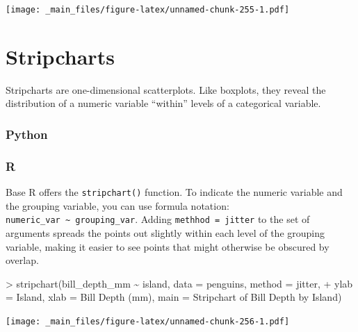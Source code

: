 \documentclass[
]{book}
\newenvironment{Shaded}{\begin{snugshade}}{\end{snugshade}}
\newcommand{\AttributeTok}[1]{\textcolor[rgb]{0.77,0.63,0.00}{#1}}
\newcommand{\FunctionTok}[1]{\textcolor[rgb]{0.00,0.00,0.00}{#1}}
\newcommand{\NormalTok}[1]{#1}
\newcommand{\SpecialCharTok}[1]{\textcolor[rgb]{0.00,0.00,0.00}{#1}}
\newcommand{\StringTok}[1]{\textcolor[rgb]{0.31,0.60,0.02}{#1}}
\begin{document}
\texttt{[image: \_main\_files/figure-latex/unnamed-chunk-255-1.pdf]}

\hypertarget{stripcharts}{%
\section{Stripcharts}\label{stripcharts}}

Stripcharts are one-dimensional scatterplots. Like boxplots, they reveal the distribution of a numeric variable ``within'' levels of a categorical variable.

\hypertarget{python-42}{%
\subsubsection*{Python}\label{python-42}}

\hypertarget{r-42}{%
\subsubsection*{R}\label{r-42}}

Base R offers the \texttt{stripchart()} function. To indicate the numeric variable and the grouping variable, you can use formula notation: \texttt{numeric\_var\ \textasciitilde{}\ grouping\_var}. Adding \texttt{methhod\ =\ \textquotesingle{}jitter\textquotesingle{}} to the set of arguments spreads the points out slightly within each level of the grouping variable, making it easier to see points that might otherwise be obscured by overlap.

\begin{Shaded}
\begin{Highlighting}[]
\SpecialCharTok{\textgreater{}} \FunctionTok{stripchart}\NormalTok{(bill\_depth\_mm }\SpecialCharTok{\textasciitilde{}}\NormalTok{ island, }\AttributeTok{data =}\NormalTok{ penguins, }\AttributeTok{method =} \StringTok{\textquotesingle{}jitter\textquotesingle{}}\NormalTok{,}
\SpecialCharTok{+}            \AttributeTok{ylab =} \StringTok{\textquotesingle{}Island\textquotesingle{}}\NormalTok{, }\AttributeTok{xlab =} \StringTok{\textquotesingle{}Bill Depth (mm)\textquotesingle{}}\NormalTok{, }\AttributeTok{main =} \StringTok{\textquotesingle{}Stripchart of Bill Depth by Island\textquotesingle{}}\NormalTok{)}
\end{Highlighting}
\end{Shaded}

\texttt{[image: \_main\_files/figure-latex/unnamed-chunk-256-1.pdf]}
\end{document}
